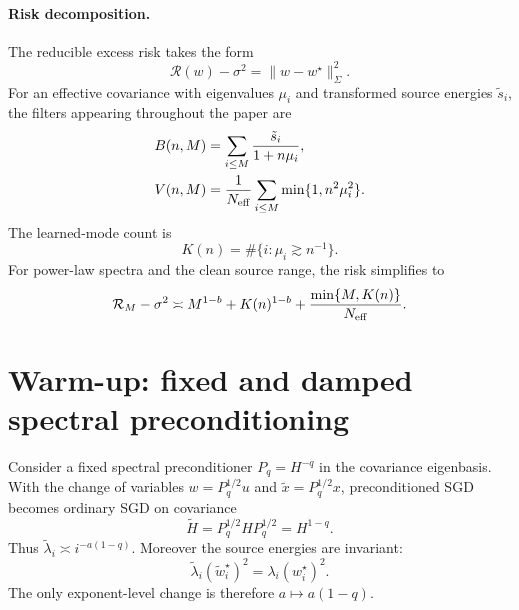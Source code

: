 \documentclass[11pt]{article}
\newcommand{\risk}{\mathcal R}
\begin{document}
\paragraph{Risk decomposition.}
The reducible excess risk takes the form
\begin{equation}
    \risk(w)-\sigma^2=\|w-w^\star\|_\Sigma^2.
\end{equation}
For an effective covariance with eigenvalues $\mu_i$ and transformed source energies $\tilde s_i$, the filters appearing throughout the paper are
\begin{align}
    B(n,M)&=\sum_{i\le M}\frac{\tilde s_i}{1+n\mu_i},\label{eq:bias-filter}\\
    V(n,M)&=\frac{1}{N_{\rm eff}}\sum_{i\le M}\min\{1,n^2\mu_i^2\}.\label{eq:variance-filter}
\end{align}
The learned-mode count is
\begin{equation}
    K(n)=\#\{i:\mu_i\gtrsim n^{-1}\}.
\end{equation}
For power-law spectra and the clean source range, the risk simplifies to
\begin{equation}
\label{eq:simple-risk}
    \risk_M-\sigma^2
    \asymp
    M^{1-b}+K(n)^{1-b}+\frac{\min\{M,K(n)\}}{N_{\rm eff}}.
\end{equation}

\section{Warm-up: fixed and damped spectral preconditioning}

Consider a fixed spectral preconditioner $P_q=H^{-q}$ in the covariance eigenbasis.  With the change of variables $w=P_q^{1/2}u$ and $\tilde x=P_q^{1/2}x$, preconditioned SGD becomes ordinary SGD on covariance
\begin{equation}
    \tilde H=P_q^{1/2}HP_q^{1/2}=H^{1-q}.
\end{equation}
Thus $\tilde\lambda_i\asymp i^{-a(1-q)}$.  Moreover the source energies are invariant:
\begin{equation}
    \tilde\lambda_i(\tilde w_i^\star)^2=\lambda_i(w_i^\star)^2.
\end{equation}
The only exponent-level change is therefore $a\mapsto a(1-q)$.
\end{document}
